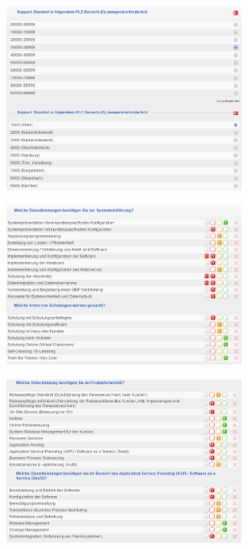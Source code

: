 \documentclass[12pt]{article}
\begin{document}
\begin{figure}[!h]
\centering
\includegraphics[width=0.7\textwidth]{images/tr53}
\end{figure}\FloatBarrier
\noindent
\begin{figure}[!h]
\centering
\includegraphics[width=0.7\textwidth]{images/tr54}
\end{figure}\FloatBarrier
\noindent
\begin{figure}[!h]
\centering
\includegraphics[width=0.7\textwidth]{images/tr55}
\end{figure}\FloatBarrier
\noindent
\end{document}
